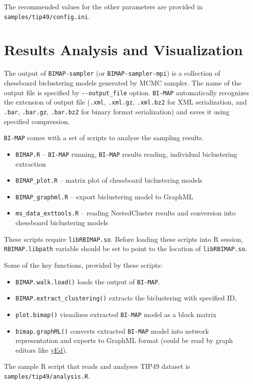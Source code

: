 \documentclass[microtype,a4paper,article,10pt,oneside,final]{memoir}
\newcommand{\bimap}{\texttt{BI-MAP}\xspace}
\begin{document}
The recommended values for the other parameters are provided in \texttt{samples/tip49/config.ini}.

\section{Results Analysis and Visualization}

The output of \texttt{BIMAP-sampler} (or \texttt{BIMAP-sampler-mpi})
is a collection of chessboard biclustering models generated by MCMC sampler.
The name of the output file is specified by \verb|--output_file| option.
\bimap automatically recognizes the extension of output file (\texttt{.xml}, \texttt{.xml.gz}, \texttt{.xml.bz2}
for XML serialization, and \texttt{.bar}, \texttt{.bar.gz}, \texttt{.bar.bz2} for binary format serialization)
and saves it using specified compression.

\bimap comes with a set of scripts to analyse the sampling results.
\begin{itemize}
  \item \texttt{BIMAP.R} -- \bimap running, \bimap results reading,
individual biclustering extraction
  \item \texttt{BIMAP\_plot.R} -- matrix plot of chessboard biclustering models
  \item \texttt{BIMAP\_graphml.R} -- export biclustering model to GraphML
  \item \texttt{ms\_data\_exttools.R} -- reading NestedCluster results and conversion into chessboard biclustering models
\end{itemize}

These scripts require \texttt{libRBIMAP.so}.
Before loading these scripts into R session,
\texttt{RBIMAP.libpath} variable should be set to point to the location of \texttt{libRBIMAP.so}.

Some of the key functions, provided by these scripts:
\begin{itemize}
\item \texttt{BIMAP.walk.load()} loads the output of \bimap.
\item \texttt{BIMAP.extract\_clustering()} extracts the biclustering with specified ID,
\item \texttt{plot.bimap()} visualizes extracted \bimap model as a block matrix
\item \texttt{bimap.graphML()} converts extracted \bimap model into network representation and exports to GraphML format
(could be read by graph editors like \href{http://yed.yworks.com}{yEd}).
\end{itemize}

The sample R script that reads and analyses TIP49 dataset is \texttt{samples/tip49/analysis.R}.
\end{document}
